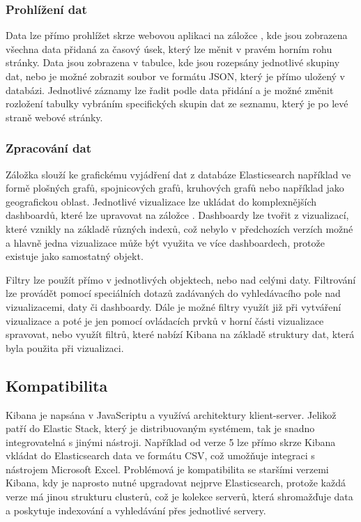 \documentclass[czech,BP]{thesiskiv}
\begin{document}
 \subsubsection{Prohlížení dat}
 Data lze přímo prohlížet skrze webovou aplikaci na záložce , kde jsou zobrazena všechna data přidaná za časový úsek, který lze měnit v pravém horním rohu stránky. Data jsou zobrazena v tabulce, kde jsou rozepsány jednotlivé skupiny dat, nebo je možné zobrazit soubor ve formátu JSON, který je přímo uložený v databázi. Jednotlivé záznamy lze řadit podle data přidání a je možné změnit rozložení tabulky vybráním specifických skupin dat ze seznamu, který je po levé straně webové stránky.
 
 \subsubsection{Zpracování dat}
 Záložka  slouží ke grafickému vyjádření dat z databáze Elasticsearch například ve formě plošných grafů, spojnicových grafů, kruhových grafů nebo například jako geografickou oblast. Jednotlivé vizualizace lze ukládat do komplexnějších dashboardů, které lze upravovat na záložce . Dashboardy lze tvořit z vizualizací, které vznikly na základě různých indexů, což nebylo v předchozích verzích možné a hlavně jedna vizualizace může být využita ve více dashboardech, protože existuje jako samostatný objekt.
 
 
 Filtry lze použít přímo v jednotlivých objektech, nebo nad celými daty. Filtrování lze provádět pomocí speciálních dotazů zadávaných do vyhledávacího pole nad vizualizacemi, daty či dashboardy. Dále je možné filtry využít již při vytváření vizualizace a poté je jen pomocí ovládacích prvků v horní části vizualizace spravovat, nebo využít filtrů, které nabízí Kibana na základě struktury dat, která byla použita při vizualizaci.\cite{KibanaQueries}
 
 \subsection{Kompatibilita}
	Kibana je napsána v JavaScriptu a využívá architektury klient-server. Jelikož patří do Elastic Stack, který je distribuovaným systémem, tak je snadno integrovatelná s jinými nástroji. Například od verze 5 lze přímo skrze Kibana vkládat do Elasticsearch data ve formátu CSV, což umožňuje integraci s nástrojem Microsoft Excel. Problémová je kompatibilita se staršími verzemi Kibana, kdy je naprosto nutné upgradovat nejprve Elasticsearch, protože každá verze má jinou strukturu clusterů, což je kolekce serverů, která shromažďuje data a poskytuje indexování a vyhledávání přes jednotlivé servery.\cite{KibanaClusters}
 
\end{document}

